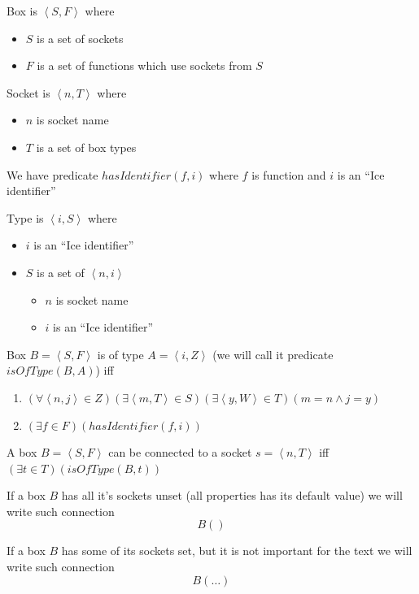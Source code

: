 \documentclass[a4paper,12pt]{book}
\begin{document}
Box is $\left<S,F\right>$ where
\begin{itemize}
	\item $S$ is a set of sockets
	\item $F$ is a set of functions which use sockets from $S$
\end{itemize}
	
Socket is $\left<n,T\right>$ where
\begin{itemize}
	\item $n$ is socket name
	\item $T$ is a set of box types
\end{itemize}

We have predicate $hasIdentifier(f,i)$ where $f$ is function and $i$ is an ``Ice identifier''

Type is $\left<i,S\right>$ where
\begin{itemize}
	\item $i$ is an ``Ice identifier''
	\item $S$ is a set of $\left<n,i\right>$
	\begin{itemize}
		\item $n$ is socket name
		\item $i$ is an ``Ice identifier''
	\end{itemize}
\end{itemize}

Box $B=\left<S,F\right>$ is of type $A=\left<i,Z\right>$ (we will call it predicate $isOfType(B,A)$) iff 
\begin{enumerate}
	\item $(\forall \left<n,j\right>\in Z)(\exists \left<m,T\right>\in S)(\exists \left<y,W\right>\in T)(m=n \wedge j=y)$
	\item $(\exists f\in F)(hasIdentifier(f,i))$
\end{enumerate}

A box $B=\left<S,F\right>$ can be connected to a socket $s=\left<n,T\right>$ iff $(\exists t\in T)(isOfType(B,t))$

If a box $B$ has all it's sockets unset (all properties has its default value) we will write such connection
\begin{equation}
B()
\end{equation}

If a box $B$ has some of its sockets set, but it is not important for the text we will write such connection
\begin{equation}
B(\dots)
\end{equation}
\end{document}
